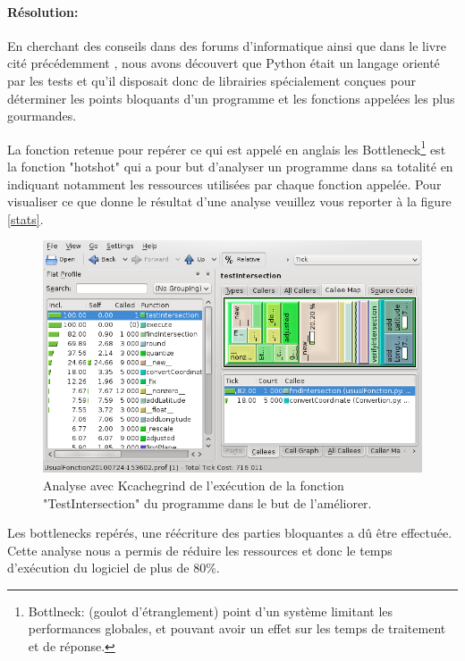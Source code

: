             \paragraph{Résolution:}
En cherchant des conseils dans des forums d'informatique ainsi que dans le livre cité précédemment , nous avons découvert que Python était un langage orienté par les tests et qu'il disposait donc de librairies spécialement conçues pour déterminer les points bloquants d'un programme et les fonctions appelées les plus gourmandes.

La fonction retenue pour repérer ce qui est appelé en anglais les Bottleneck\footnote{Bottlneck: (goulot d'étranglement) point d'un système limitant les performances globales, et pouvant avoir un effet sur les temps de traitement et de réponse.} est la fonction "hotshot" qui a pour but d'analyser un programme dans sa totalité en indiquant notamment les ressources utilisées par chaque fonction appelée. Pour visualiser ce que donne le résultat d'une analyse veuillez vous reporter à la figure \vref{stats}.
\begin{figure}
\center
\includegraphics[width=15cm]{images/stats.png}
\caption{Analyse avec Kcachegrind de l'exécution de la fonction "TestIntersection" du programme dans le but de l'améliorer.}
\label{stats}
\end{figure}

Les bottlenecks repérés, une réécriture des parties bloquantes a dû être effectuée. Cette analyse nous a permis de réduire les ressources et donc le temps d'exécution du logiciel de plus de 80\%.
